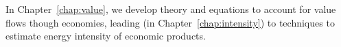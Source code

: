 In Chapter~\ref{chap:value}, we develop theory and equations to account
for value flows though economies, leading (in Chapter~\ref{chap:intensity})
to techniques to estimate energy intensity of economic products.








%
%




